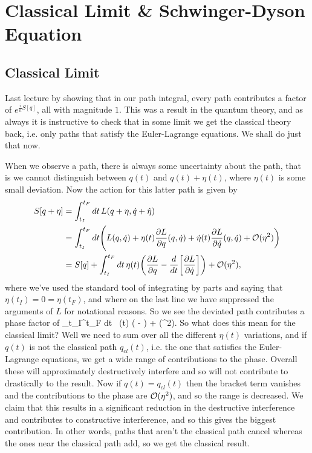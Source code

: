 \chapter{Classical Limit \& Schwinger-Dyson Equation}

\section{Classical Limit}

Last lecture by showing that in our path integral, every path contributes a factor of $e^{\frac{i}{\hbar}S[q]}$, all with magnitude $1$. This was a result in the quantum theory, and as always it is instructive to check that in some limit we get the classical theory back, i.e. only paths that satisfy the Euler-Lagrange equations. We shall do just that now. 

When we observe a path, there is always some uncertainty about the path, that is we cannot distinguish between $q(t)$ and $q(t)+\eta(t)$, where $\eta(t)$ is some small deviation. Now the action for this latter path is given by 
\begin{equation*}
    \begin{split}
        S[q+\eta] & = \int_{t_I}^{t_F} dt \, L(q+\eta, \dot{q}+\dot{\eta}) \\
        & = \int_{t_I}^{t_F} dt \Bigg( L(q,\dot{q}) + \eta(t) \frac{\partial L}{\partial q}(q,\dot{q}) + \dot{\eta}(t) \frac{\partial L}{\partial \dot{q}}(q,\dot{q}) + \mathcal{O}(\eta^2)\bigg) \\
        & = S[q] + \int_{t_I}^{t_F} dt \, \eta(t) \bigg( \frac{\partial L}{\partial q} -\frac{d}{dt} \bigg[\frac{\partial L}{\partial \dot{q}}\bigg]\bigg) + \mathcal{O}(\eta^2),
    \end{split}
\end{equation*}
where we've used the standard tool of integrating by parts and saying that $\eta(t_I)=0=\eta(t_F)$, and where on the last line we have suppressed the arguments of $L$ for notational reasons. So we see the deviated path contributes a phase factor of 
\bse 
    \int_{t_I}^{t_F} dt \, \eta(t) \bigg(  - \bigg) + \cO(\eta^2).
\ese 
So what does this mean for the classical limit? Well we need to sum over all the different $\eta(t)$ variations, and if $q(t)$ is not the classical path $q_{cl}(t)$, i.e. the one that satisfies the Euler-Lagrange equations, we get a wide range of contributions to the phase. Overall these will approximately destructively interfere and so will not contribute to drastically to the result. Now if $q(t)=q_{cl}(t)$ then the bracket term vanishes and the contributions to the phase are $\mathcal{O}(\eta^2)$, and so the range is decreased. We claim that this results in a significant reduction in the destructive interference and contributes to constructive interference, and so this gives the biggest contribution. In other words, paths that aren't the classical path cancel whereas the ones near the classical path add, so we get the classical result. 

